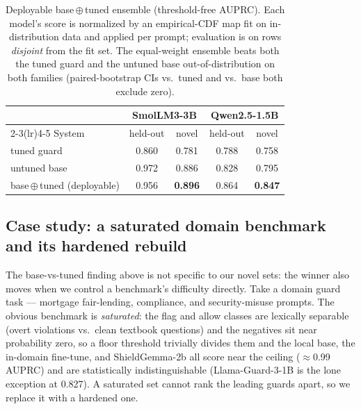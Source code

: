 \documentclass[sigconf,nonacm]{acmart}
\begin{document}
\begin{table}[t]
\small
\centering
\setlength{\tabcolsep}{4pt}
\caption{Deployable base\,$\oplus$\,tuned ensemble (threshold-free AUPRC). Each model's score is normalized by an empirical-CDF map fit on in-distribution data and applied per prompt; evaluation is on rows \emph{disjoint} from the fit set. The equal-weight ensemble beats both the tuned guard and the untuned base out-of-distribution on both families (paired-bootstrap CIs vs.\ tuned and vs.\ base both exclude zero).}
\label{tab:ensemble}
\begin{tabular}{lcccc}
\toprule
 & \multicolumn{2}{c}{SmolLM3-3B} & \multicolumn{2}{c}{Qwen2.5-1.5B} \\
\cmidrule(lr){2-3}\cmidrule(lr){4-5}
System & held-out & novel & held-out & novel \\
\midrule
tuned guard  & 0.860 & 0.781 & 0.788 & 0.758 \\
untuned base & 0.972 & 0.886 & 0.828 & 0.795 \\
base\,$\oplus$\,tuned (deployable) & 0.956 & \textbf{0.896} & 0.864 & \textbf{0.847} \\
\bottomrule
\end{tabular}
\end{table}

\subsection{Case study: a saturated domain benchmark and its hardened rebuild}
\label{sec:mortgage-casestudy}

The base-vs-tuned finding above is not specific to our novel sets: the winner also moves when we control a benchmark's difficulty directly. Take a domain guard task --- mortgage fair-lending, compliance, and security-misuse prompts. The obvious benchmark is \emph{saturated}: the flag and allow classes are lexically separable (overt violations vs.\ clean textbook questions) and the negatives sit near probability zero, so a floor threshold trivially divides them and the local base, the in-domain fine-tune, and ShieldGemma-2b all score near the ceiling ($\approx$0.99 AUPRC) and are statistically indistinguishable (Llama-Guard-3-1B is the lone exception at 0.827). A saturated set cannot rank the leading guards apart, so we replace it with a hardened one.
\end{document}
